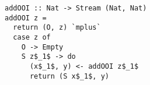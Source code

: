 \begin{figure}[!t]
  \centering
  \begin{minipage}{\columnwidth}
    \begin{lstlisting}[frame=tb]
addOOI :: Nat -> Stream (Nat, Nat)
addOOI z =
  return (O, z) `mplus`
  case z of
    O -> Empty
    S z$_1$ -> do
      (x$_1$, y) <- addOOI z$_1$
      return (S x$_1$, y)
    \end{lstlisting}
  \end{minipage}
\end{figure}